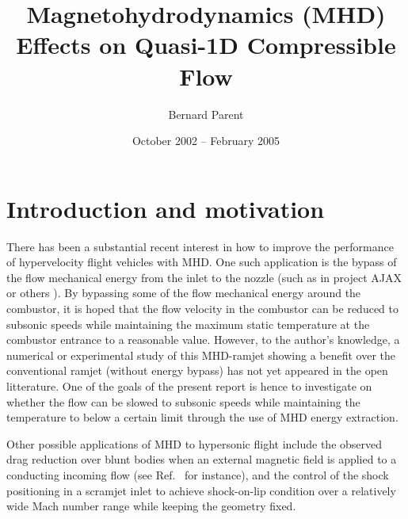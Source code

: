 \documentclass{warpdoc}
\author{
  Bernard Parent
}
\title{
  Magnetohydrodynamics (MHD) Effects on Quasi-1D Compressible Flow
}
\date{
  October 2002 -- February 2005
}
\begin{document}
  \pagestyle{headings}
  \setcounter{page}{1}
  \makewarpdoctitle
  \makeabstract
  \tableofcontents




























\section{Introduction and motivation}

There has been a substantial recent interest in how to
improve the performance of hypervelocity flight vehicles with MHD. One such application
is the bypass of the flow mechanical energy from the inlet to the nozzle (such as in
project AJAX \cite{aiaaconf:1996:gurijanov,aiaaconf:2001:kuranov} or
others \cite{aiaabook:2001:vatazhin,jpp:2001:litchford}).
By bypassing some of the flow mechanical energy around the combustor, it is hoped
that the flow velocity in the combustor can be reduced to subsonic speeds while
maintaining the maximum static temperature at the combustor entrance to a reasonable
value. However, to the author's knowledge, a numerical or experimental study of this MHD-ramjet
showing a benefit over the conventional ramjet (without energy bypass) has not yet
appeared in the open litterature. One of the goals of the present report is hence to
investigate on whether the flow can be slowed to subsonic speeds while maintaining
the temperature to below a certain limit through the use of MHD energy extraction.

Other
possible applications of MHD to hypersonic flight include the observed drag reduction
over blunt bodies when an external magnetic field is applied to a conducting incoming
flow (see Ref.\ \cite{aiaa:2002:shang} for instance), and the control of the shock positioning
in a scramjet inlet to achieve shock-on-lip condition over a relatively wide Mach number range
\cite{aiaaconf:2002:shneider} while keeping the geometry fixed.
\end{document}
